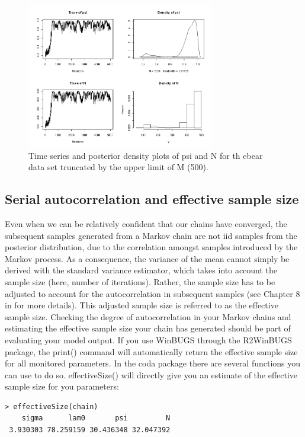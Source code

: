 \begin{figure}
\begin{center}
\includegraphics[height=2.5in]{Ch6/figs/timeseries2}
\end{center}
\caption{Time series and posterior density plots of psi and N for th
  ebear data set truncated by the upper limit of M (500).}
\label{timeseries2.fig}
\end{figure}

\subsection{Serial autocorrelation and effective sample size}
Even when we can be relatively confident that our chains have converged, the subsequent samples generated from a Markov chain are not iid samples from the posterior distribution, due to the correlation amongst samples introduced by the Markov process. As a consequence, the variance of the mean cannot simply be derived with the standard variance estimator, which takes into account the sample size (here, number of iterations). Rather, the sample size has to be adjusted to account for the autocorrelation in subsequent samples (see Chapter 8 in \citet{robert_casella:2010} for more details). This adjusted sample size is referred to as the effective sample size. Checking the degree of autocorrelation in your Markov chains and estimating the effective sample size your chain has generated should be part of evaluating your model output. If you use WinBUGS through the R2WinBUGS package, the print() command will automatically return the effective sample size for all monitored parameters. In the coda package there are several functions you can use to do so. effectiveSize() will directly give you an estimate of the effective sample size for you parameters:
\begin{verbatim}
> effectiveSize(chain)
    sigma      lam0       psi         N
 3.930303 78.259159 30.436348 32.047392
\end{verbatim}

